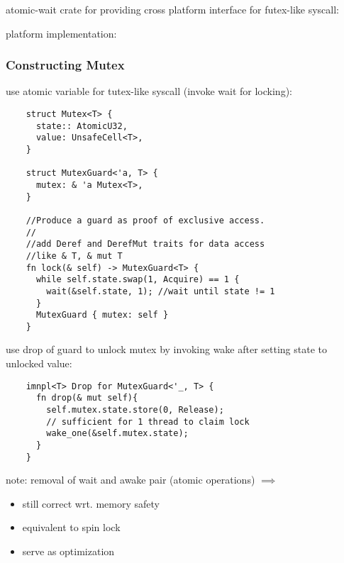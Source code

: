 \documentclass[8pt]{extarticle}
\begin{document}
\begin{multicols*}{2}
    atomic-wait crate for providing cross platform interface for futex-like syscall:
    \begin{itemize}
    \item \verb%wait(& AtomicU32, u32)%
    \item \verb%wake_one(& AtomicU32)%
    \item \verb%wake_all(& AtomicU32)%
    \end{itemize}
    platform implementation:

    \subsubsection{Constructing Mutex}
    use atomic variable for tutex-like syscall (invoke wait for locking):
\begin{verbatim}
    struct Mutex<T> {
      state:: AtomicU32,
      value: UnsafeCell<T>,
    }

    struct MutexGuard<'a, T> {
      mutex: & 'a Mutex<T>,
    }

    //Produce a guard as proof of exclusive access.
    //
    //add Deref and DerefMut traits for data access
    //like & T, & mut T
    fn lock(& self) -> MutexGuard<T> {
      while self.state.swap(1, Acquire) == 1 {
        wait(&self.state, 1); //wait until state != 1
      }
      MutexGuard { mutex: self }
    }
\end{verbatim}

    use drop of guard to unlock mutex by invoking wake after setting state to unlocked value:
\begin{verbatim}
    imnpl<T> Drop for MutexGuard<'_, T> {
      fn drop(& mut self){
        self.mutex.state.store(0, Release);
        // sufficient for 1 thread to claim lock
        wake_one(&self.mutex.state);
      }
    }
\end{verbatim}    

    note: removal of wait and awake pair (atomic operations) $\implies$
    \begin{itemize}
    \item still correct wrt. memory safety
    \item equivalent to spin lock
    \item serve as optimization
    \end{itemize}


\end{multicols*}
\end{document}
